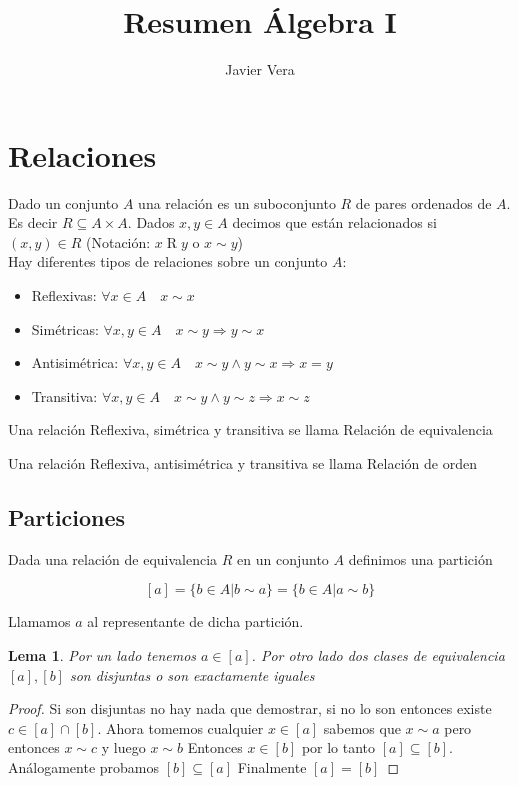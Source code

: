 \documentclass{article}
\theoremstyle{break}
\newtheorem{lemma}[theorem]{Lema}
\begin{document}
    
    \title{Resumen Álgebra I}
    \author{Javier Vera}
    \maketitle

    \section{Relaciones}
    Dado un conjunto $A$ una relación es un suboconjunto $R$ de pares ordenados de $A$.
    Es decir $R \subseteq A \times A$. Dados $x,y \in A$ decimos que están relacionados si $(x,y) \in R$
    (Notación: $x \mathrel{R} y$ o $x \sim y$) \\
    Hay diferentes tipos de relaciones sobre un conjunto $A$:
    \begin{itemize}
        \item Reflexivas: $\forall x \in A \quad x\sim x$
        \item Simétricas: $\forall x,y \in A \quad x\sim y \Rightarrow y \sim x$
        \item Antisimétrica: $\forall x,y \in A \quad x\sim y \land y\sim x \Rightarrow x = y$
        \item Transitiva: $\forall x,y \in A \quad x\sim y \land y\sim z \Rightarrow x \sim z$
    \end{itemize}  
    \noindent Una relación Reflexiva, simétrica y transitiva se llama Relación de equivalencia

    \noindent Una relación Reflexiva, antisimétrica y transitiva se llama Relación de orden 

    \subsection{Particiones}

    Dada una relación de equivalencia $R$ en un conjunto $A$ definimos una partición 
    
    $$[a] = \{b \in A | b\sim a\} = \{b \in A | a \sim b \}$$

    Llamamos $a$ al representante de dicha partición. 

    \begin{lemma}
        Por un lado tenemos $a \in [a]$. Por otro lado dos clases de equivalencia $[a],[b]$ son disjuntas
        o son exactamente iguales
    \end{lemma}
    \begin{proof}
            Si son disjuntas no hay nada que demostrar, si no lo son entonces existe $c \in [a]\cap[b]$.
            Ahora tomemos cualquier $x \in [a]$ sabemos que $x\sim a$ pero entonces $x\sim c$ y luego $x\sim b$
            Entonces $x \in [b]$ por lo tanto $[a] \subseteq [b]$. \\
            Análogamente probamos $[b] \subseteq [a]$ Finalmente $[a] = [b]$
    \end{proof}
    
\end{document}
